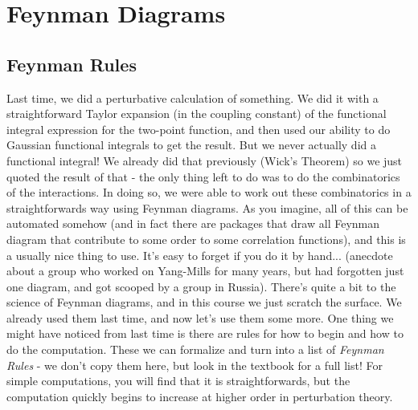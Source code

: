 \section{Feynman Diagrams}
\subsection{Feynman Rules}
Last time, we did a perturbative calculation of something. We did it with a straightforward Taylor expansion (in the coupling constant) of the functional integral expression for the two-point function, and then used our ability to do Gaussian functional integrals to get the result. But we never actually did a functional integral! We already did that previously (Wick's Theorem) so we just quoted the result of that - the only thing left to do was to do the combinatorics of the interactions. In doing so, we were able to work out these combinatorics in a straightforwards way using Feynman diagrams. As you imagine, all of this can be automated somehow (and in fact there are packages that draw all Feynman diagram that contribute to some order to some correlation functions), and this is a usually nice thing to use. It's easy to forget if you do it by hand... (anecdote about a group who worked on Yang-Mills for many years, but had forgotten just one diagram, and got scooped by a group in Russia). There's quite a bit to the science of Feynman diagrams, and in this course we just scratch the surface. We already used them last time, and now let's use them some more. One thing we might have noticed from last time is there are rules for how to begin and how to do the computation. These we can formalize and turn into a list of \emph{Feynman Rules} - we don't copy them here, but look in the textbook for a full list! For simple computations, you will find that it is straightforwards, but the computation quickly begins to increase at higher order in perturbation theory.

